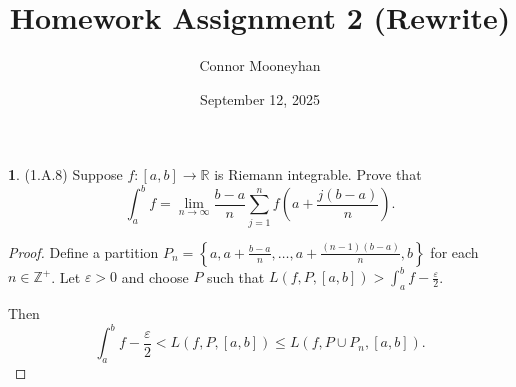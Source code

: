\documentclass[12pt]{article}
\title{Homework Assignment 2 (Rewrite)}
\author{Connor Mooneyhan}
\date{September 12, 2025}
\theoremstyle{definition}
\newtheorem{ex}{}
\begin{document}
\maketitle

\begin{ex}
	(1.A.8)
	Suppose $f: [a, b] \to \mathbb{R}$ is Riemann integrable.
	Prove that \begin{equation}\label{1.1}
		\int_a^b f = \lim_{n \to \infty} \frac{b - a}{n} \sum_{j = 1}^n f \left( a + \frac{j(b-a)}{n} \right).
	\end{equation}
\end{ex}
\begin{proof}
	Define a partition $P_n = \left\lbrace a, a + \frac{b-a}{n}, \dots, a + \frac{(n-1)(b - a)}{n}, b \right\rbrace$ for each $n \in \mathbb{Z}^+$.
	Let $\varepsilon > 0$ and choose $P$ such that $L(f, P, [a, b]) > \int_a^b f - \frac{\varepsilon}{2}$.

	Then \begin{equation}\label{1.2}
		\int_a^b f- \frac{\varepsilon}{2} < L(f, P, [a, b]) \leq L(f, P \cup P_n, [a, b]).
	\end{equation}


\end{proof}
\end{document}
